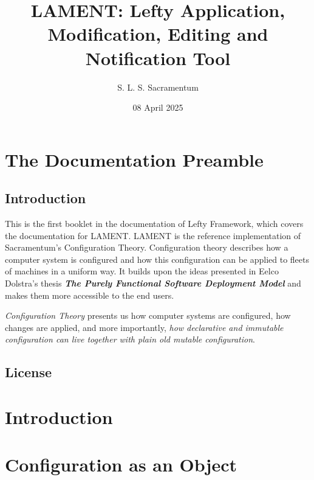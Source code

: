 \documentclass{book}
\title{LAMENT: Lefty Application, Modification, Editing and Notification Tool}
\author{S. L. S. Sacramentum}
\date{08 April 2025}
\begin{document}
    \maketitle
    \tableofcontents
    \chapter{The Documentation Preamble}
    \section{Introduction}
    This is the first booklet in the documentation of Lefty Framework, which covers the documentation for LAMENT.
    LAMENT is the reference implementation of Sacramentum's Configuration Theory. Configuration theory describes
    how a computer system is configured and how this configuration can be applied to fleets of machines in a
    uniform way. It builds upon the ideas presented in Eelco Dolstra's thesis \textbf{\textit{The Purely Functional Software Deployment Model}} and
    makes them more accessible to the end users.

    \textit{Configuration Theory} presents us how computer systems are configured, how changes are applied, and more importantly,
    \textit{how declarative and immutable configuration can live together with plain old mutable configuration}.
    \newpage
    \section{License}
    \newpage
    
    \newpage
    
    \newpage
    \chapter{Introduction}
    
    \chapter{Configuration as an Object}
    
\end{document}
